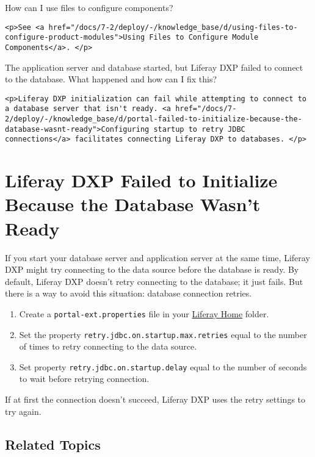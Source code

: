 {How can I use files to configure components?~{}}

\begin{verbatim}
<p>See <a href="/docs/7-2/deploy/-/knowledge_base/d/using-files-to-configure-product-modules">Using Files to Configure Module Components</a>. </p>
\end{verbatim}

{The application server and database started, but Liferay DXP failed to
connect to the database. What happened and how can I fix this?~{}}

\begin{verbatim}
<p>Liferay DXP initialization can fail while attempting to connect to a database server that isn't ready. <a href="/docs/7-2/deploy/-/knowledge_base/d/portal-failed-to-initialize-because-the-database-wasnt-ready">Configuring startup to retry JDBC connections</a> facilitates connecting Liferay DXP to databases. </p>
\end{verbatim}

\chapter{Liferay DXP Failed to Initialize Because the Database Wasn't
Ready}\label{liferay-dxp-failed-to-initialize-because-the-database-wasnt-ready}

If you start your database server and application server at the same
time, Liferay DXP might try connecting to the data source before the
database is ready. By default, Liferay DXP doesn't retry connecting to
the database; it just fails. But there is a way to avoid this situation:
database connection retries.

\begin{enumerate}
\def\labelenumi{\arabic{enumi}.}
\item
  Create a \texttt{portal-ext.properties} file in your
  \href{/docs/7-1/deploy/-/knowledge_base/d/liferay-home}{Liferay Home}
  folder.
\item
  Set the property \texttt{retry.jdbc.on.startup.max.retries} equal to
  the number of times to retry connecting to the data source.
\item
  Set property \texttt{retry.jdbc.on.startup.delay} equal to the number
  of seconds to wait before retrying connection.
\end{enumerate}

If at first the connection doesn't succeed, Liferay DXP uses the retry
settings to try again.

\section{Related Topics}\label{related-topics-4}

